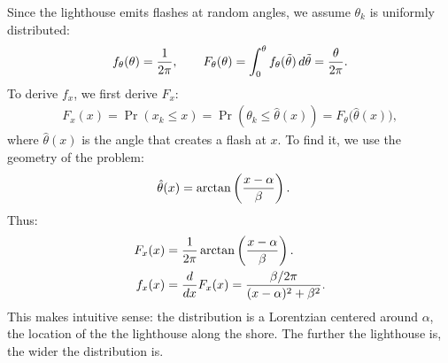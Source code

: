 \documentclass{article}
\theoremstyle{definition}
\renewcommand{\dd}[2]{\ensuremath\frac{d#1}{d#2}}
\renewcommand{\sp}[1]{\;\;\;\text{ #1 }\;\;\;}
\begin{document}
Since the lighthouse emits flashes at random angles, we assume
$\theta_k$ is uniformly distributed:
\begin{align*}
f_\theta(\theta) = {1 \over 2\pi},
\sp{}
F_\theta(\theta) = \int_0^\theta f_\theta(\tilde\theta) \, d\tilde\theta
= {\theta \over 2\pi}.
\end{align*}
To derive $f_x$, we first derive $F_x$:
\begin{align*}
F_x(x) = \Pr(x_k \le x) = \Pr(\theta_k \le \hat\theta(x)) =
F_\theta\Big(\hat\theta(x)\Big),
\end{align*}
where $\hat\theta(x)$ is the angle that creates a flash at $x$. To find it,
we use the geometry of the problem:
\begin{align*}
\hat\theta(x) &= \arctan\left(x - \alpha \over \beta\right).
\end{align*}
Thus:
\begin{align*}
F_x(x) &= {1 \over 2\pi} \arctan\left(x - \alpha \over \beta\right).
\\
f_x(x) &= \dd{}{x} F_x(x) = {\beta / 2\pi \over (x - \alpha)^2 + \beta^2}.
\end{align*}
This makes intuitive sense: the distribution is a Lorentzian centered
around $\alpha$, the location of the the lighthouse along the shore. The
further the lighthouse is, the wider the distribution is.
\end{document}
